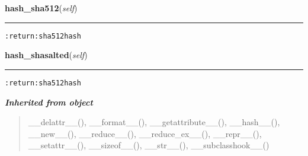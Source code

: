 \hspace{.8\funcindent}\begin{boxedminipage}{\funcwidth}

    \raggedright \textbf{hash\_sha512}(\textit{self})

    \vspace{-1.5ex}

    \rule{\textwidth}{0.5\fboxrule}
\setlength{\parskip}{2ex}
\begin{alltt}

:return: sha512 hash
\end{alltt}

\setlength{\parskip}{1ex}
    \end{boxedminipage}

    \label{hal:maths:crypt:SHA:hash_shasalted}

    \vspace{0.5ex}

\hspace{.8\funcindent}\begin{boxedminipage}{\funcwidth}

    \raggedright \textbf{hash\_shasalted}(\textit{self})

    \vspace{-1.5ex}

    \rule{\textwidth}{0.5\fboxrule}
\setlength{\parskip}{2ex}
\begin{alltt}

:return: sha512 hash
\end{alltt}

\setlength{\parskip}{1ex}
    \end{boxedminipage}


\large{\textbf{\textit{Inherited from object}}}

\begin{quote}
\_\_delattr\_\_(), \_\_format\_\_(), \_\_getattribute\_\_(), \_\_hash\_\_(), \_\_new\_\_(), \_\_reduce\_\_(), \_\_reduce\_ex\_\_(), \_\_repr\_\_(), \_\_setattr\_\_(), \_\_sizeof\_\_(), \_\_str\_\_(), \_\_subclasshook\_\_()
\end{quote}


